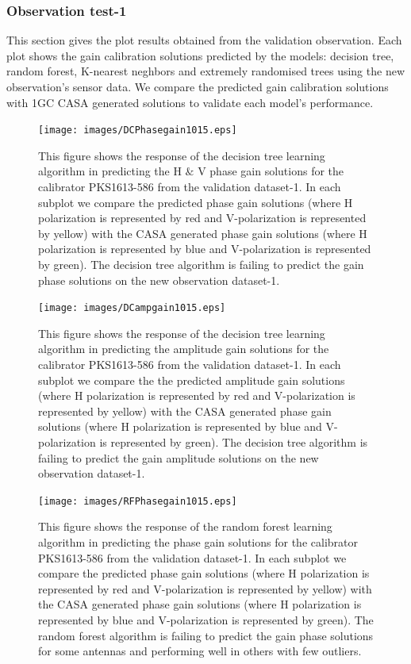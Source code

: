 \subsubsection{Observation test-1}
This section gives the plot results obtained from the validation observation.  Each plot shows the gain calibration solutions predicted by the models: decision tree, random forest, K-nearest neghbors and extremely randomised trees using the new observation's sensor data. We compare the predicted gain calibration solutions with 1GC CASA generated solutions to validate each model's performance. 

\begin{figure}[H]
    \texttt{[image: images/DCPhasegain1015.eps]}
    \caption{This figure shows the response of the decision tree learning algorithm in predicting the H $\&$ V phase gain solutions for the calibrator PKS1613-586 from the validation dataset-1. In each subplot we compare the predicted phase gain solutions (where H polarization is represented by red and V-polarization is represented by yellow) with the CASA generated phase gain solutions (where H polarization is represented by blue and V-polarization is represented by green). The decision tree algorithm is failing to predict the gain phase solutions on the new observation dataset-1.}
    \label{obs5}
\end{figure}

\begin{figure}[H]
    \texttt{[image: images/DCampgain1015.eps]}
    \caption{This figure shows the response of the decision tree learning algorithm in predicting the amplitude gain solutions for the calibrator PKS1613-586 from the validation dataset-1. In each subplot we compare the the predicted amplitude gain solutions (where H polarization is represented by red and V-polarization is represented by yellow) with the CASA generated phase gain solutions (where H polarization is represented by blue and V-polarization is represented by green). The decision tree algorithm is failing to predict the gain amplitude solutions on the new observation dataset-1.}
     \label{da2}
\end{figure}


\begin{figure}[H]
    \texttt{[image: images/RFPhasegain1015.eps]}
    \caption{This figure shows the response of the random forest learning algorithm in predicting the phase gain solutions for the calibrator PKS1613-586 from the validation dataset-1. In each subplot we compare the predicted phase gain solutions (where H polarization is represented by red and V-polarization is represented by yellow) with the CASA generated phase gain solutions (where H polarization is represented by blue and V-polarization is represented by green). The random forest algorithm is failing to predict the gain phase solutions for some antennas and performing well in others with few outliers.}
    \label{obs6}
\end{figure}

